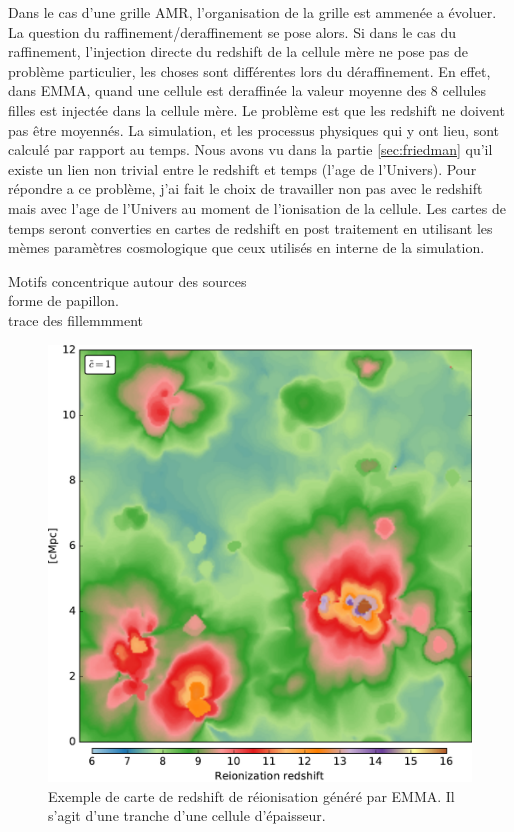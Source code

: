 Dans le cas d'une grille AMR, l'organisation de la grille est ammenée a évoluer.
La question du raffinement/deraffinement  se pose alors.
Si dans le cas du raffinement, l'injection directe du redshift de la cellule mère ne pose pas de problème particulier, les choses sont différentes lors du déraffinement.
En effet, dans EMMA, quand une cellule est deraffinée la valeur moyenne des 8 cellules filles est injectée dans la cellule mère.
Le problème est que les redshift ne doivent pas être moyennés.
La simulation, et les processus physiques qui y ont lieu, sont calculé par rapport au temps.
Nous avons vu dans la partie \ref{sec:friedman} qu'il existe un lien non trivial entre le redshift et temps (l'age de l'Univers).
Pour répondre a ce problème, j'ai fait le choix de travailler non pas avec le redshift mais avec l'age de l'Univers au moment de l'ionisation de la cellule.
Les cartes de temps seront converties en cartes de redshift en post traitement en utilisant les mèmes paramètres cosmologique que ceux utilisés en interne de la simulation.



Motifs concentrique autour des sources\\

forme de papillon.\\

trace des fillemmment\\


\begin{figure}[htpb]
        \includegraphics[width=.95\linewidth]{img/04_mapreio/map_z_c1.pdf} 
        \caption{Exemple de carte de redshift de réionisation généré par EMMA.
        Il s'agit d'une tranche d'une cellule d'épaisseur.
        }
 		\label{fig:zmap}
\end{figure}

